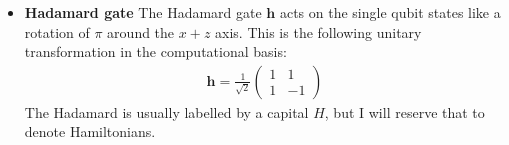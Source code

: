 \documentclass[a4paper,11pt]{article}
\begin{document}
\begin{itemize}
Another common notation is the $\bm{R_{\varphi}}$ gate, which is equivalent to $\bm{Z}^{\varphi/\pi}$. This is an operator that
introduces a phase difference between the two computational basis states:
\begin{eqnarray}
\bm{R_{\varphi}} = 
\begin{pmatrix} 1 & 0 \\ 0 & {\rm e}^{\varphi} \end{pmatrix}
\end{eqnarray}
\item{\bf Hadamard gate}
The Hadamard gate $\bm{h}$ acts on the single qubit states like a rotation of $\pi$ around the $x + z$ axis.
 This is the following unitary transformation in the computational basis:
%
\begin{eqnarray} \label{eq:hgate}
\bm{h} = \frac{1}{\sqrt{2}}
\begin{pmatrix} 1 & 1 \\ 1 & -1 \end{pmatrix}
\end{eqnarray}
%
The Hadamard is usually labelled by a capital $H$, but I will reserve that to denote Hamiltonians.

\end{itemize}
\end{document}
